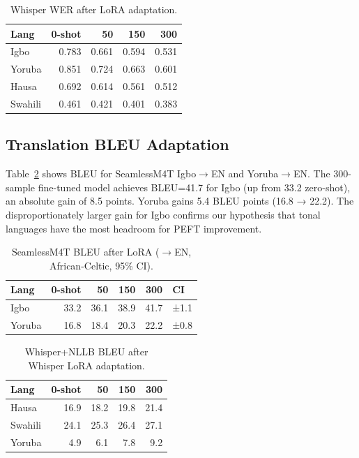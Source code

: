 \documentclass[11pt,a4paper]{article}
\begin{document}
\begin{table}[t]
\centering
\small
\caption{Whisper WER after LoRA adaptation.}
\label{tab:whisper_wer}
\begin{tabular}{lrrrr}
\toprule
\textbf{Lang} & \textbf{0-shot} & \textbf{50} & \textbf{150} & \textbf{300} \\
\midrule
Igbo    & 0.783 & 0.661 & 0.594 & 0.531 \\
Yoruba  & 0.851 & 0.724 & 0.663 & 0.601 \\
Hausa   & 0.692 & 0.614 & 0.561 & 0.512 \\
Swahili & 0.461 & 0.421 & 0.401 & 0.383 \\
\bottomrule
\end{tabular}
\end{table}

\subsection{Translation BLEU Adaptation}

Table~\ref{tab:bleu_adaptation} shows BLEU for SeamlessM4T Igbo$\to$EN and Yoruba$\to$EN. The 300-sample fine-tuned model achieves BLEU=41.7 for Igbo (up from 33.2 zero-shot), an absolute gain of 8.5 points. Yoruba gains 5.4 BLEU points (16.8 → 22.2). The disproportionately larger gain for Igbo confirms our hypothesis that tonal languages have the most headroom for PEFT improvement.

\begin{table}[t]
\centering
\small
\caption{SeamlessM4T BLEU after LoRA ($\to$EN, African-Celtic, 95\% CI).}
\label{tab:bleu_adaptation}
\begin{tabular}{lrrrrl}
\toprule
\textbf{Lang} & \textbf{0-shot} & \textbf{50} & \textbf{150} & \textbf{300} & \textbf{CI} \\
\midrule
Igbo   & 33.2 & 36.1 & 38.9 & 41.7 & ±1.1 \\
Yoruba & 16.8 & 18.4 & 20.3 & 22.2 & ±0.8 \\
\bottomrule
\end{tabular}
\end{table}

\begin{table}[t]
\centering
\small
\caption{Whisper+NLLB BLEU after Whisper LoRA adaptation.}
\label{tab:cascade_bleu}
\begin{tabular}{lrrrr}
\toprule
\textbf{Lang} & \textbf{0-shot} & \textbf{50} & \textbf{150} & \textbf{300} \\
\midrule
Hausa   & 16.9 & 18.2 & 19.8 & 21.4 \\
Swahili & 24.1 & 25.3 & 26.4 & 27.1 \\
Yoruba  &  4.9 &  6.1 &  7.8 &  9.2 \\
\bottomrule
\end{tabular}
\end{table}
\end{document}
